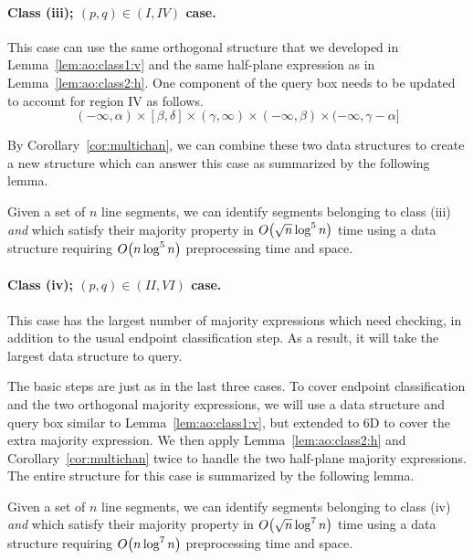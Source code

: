 \paragraph{Class (iii); $(p, q) \in (I, IV)$ case.} 
This case can use the same orthogonal structure that we developed in Lemma~\ref{lem:ao:class1:v} and the same half-plane expression as in Lemma~\ref{lem:ao:class2:h}. 
One component of the query box needs to be updated to account for region IV as follows.
\[
(-\infty, \alpha) \times [\beta, \delta] \times (\gamma, \infty) \times (-\infty, \beta) \times (-\infty, \gamma - \alpha]
\]

By Corollary~\ref{cor:multichan}, we can combine these two data structures to create a new structure which can answer this case as summarized by the following lemma.

\begin{lemma}
\label{lem:ao:class3:c}
Given a set of $n$ line segments, we can identify segments belonging to class (iii) \emph{and} which satisfy their majority property in $O\!\left(\sqrt{n}\log^5{n}\right)$ time using a data structure requiring $O\!\left(n\log^5{n}\right)$ preprocessing time and space.
\end{lemma}


\paragraph{Class (iv); $(p, q) \in (II, VI)$ case.} 
This case has the largest number of majority expressions which need checking, in addition to the usual endpoint classification step. As a result, it will take the largest data structure to query.

The basic steps are just as in the last three cases. To cover endpoint classification and the two orthogonal majority expressions, we will use a data structure and query box similar to Lemma~\ref{lem:ao:class1:v}, but extended to 6D to cover the extra majority expression.  We then apply Lemma~\ref{lem:ao:class2:h} and Corollary~\ref{cor:multichan} twice to handle the two half-plane majority expressions. The entire structure for this case is summarized by the following lemma.

\begin{lemma}
\label{lem:ao:class4:c}
Given a set of $n$ line segments, we can identify segments belonging to class (iv) \emph{and} which satisfy their majority property in $O\!\left(\sqrt{n}\log^7{n}\right)$ time using a data structure requiring $O\!\left(n\log^7{n}\right)$ preprocessing time and space.
\end{lemma}


